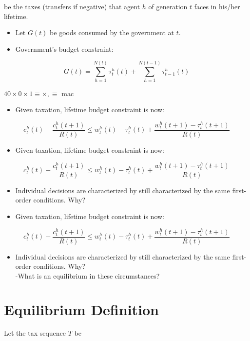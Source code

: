 \documentclass[10pt]{article}
\begin{document}
be the taxes (transfers if negative) that agent $h$ of generation $t$ faces in his/her lifetime.

\begin{itemize}
  \item Let $G(t)$ be goods consumed by the government at $t$.
  \item Government's budget constraint:
\end{itemize}

$$
G(t)=\sum_{h=1}^{N(t)} \tau_{t}^{h}(t)+\sum_{h=1}^{N(t-1)} \tau_{t-1}^{h}(t)
$$

$40 \times 0 \times 1 \equiv \times, \equiv$ mac

\begin{itemize}
  \item Given taxation, lifetime budget constraint is now:
\end{itemize}

$$
c_{t}^{h}(t)+\frac{c_{t}^{h}(t+1)}{R(t)} \leq w_{t}^{h}(t)-\tau_{t}^{h}(t)+\frac{w_{t}^{h}(t+1)-\tau_{t}^{h}(t+1)}{R(t)}
$$

\begin{itemize}
  \item Given taxation, lifetime budget constraint is now:
\end{itemize}

$$
c_{t}^{h}(t)+\frac{c_{t}^{h}(t+1)}{R(t)} \leq w_{t}^{h}(t)-\tau_{t}^{h}(t)+\frac{w_{t}^{h}(t+1)-\tau_{t}^{h}(t+1)}{R(t)}
$$

\begin{itemize}
  \item Individual decisions are characterized by still characterized by the same first-order conditions. Why?
  \item Given taxation, lifetime budget constraint is now:
\end{itemize}

$$
c_{t}^{h}(t)+\frac{c_{t}^{h}(t+1)}{R(t)} \leq w_{t}^{h}(t)-\tau_{t}^{h}(t)+\frac{w_{t}^{h}(t+1)-\tau_{t}^{h}(t+1)}{R(t)}
$$

\begin{itemize}
  \item Individual decisions are characterized by still characterized by the same first-order conditions. Why?\\
-What is an equilibrium in these circumstances?
\end{itemize}

\section*{Equilibrium Definition}
Let the tax sequence $T$ be
\end{document}
